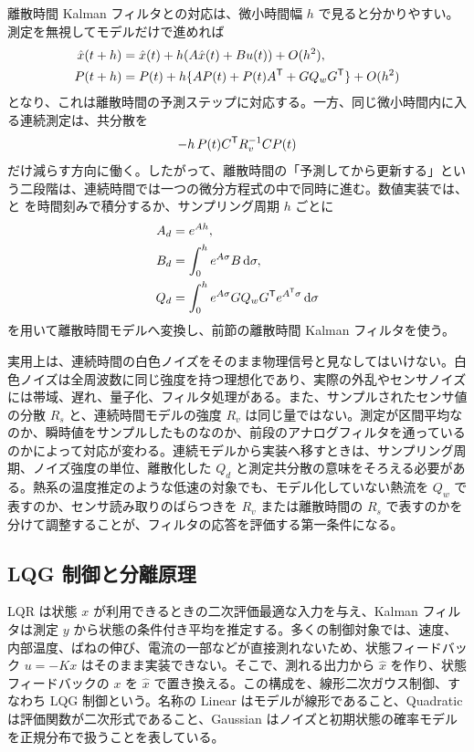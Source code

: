 離散時間 Kalman フィルタとの対応は、微小時間幅 $h$ で見ると分かりやすい。測定を無視してモデルだけで進めれば
\begin{align}
  \hat{x}(t+h)&=\hat{x}(t)+h(A\hat{x}(t)+Bu(t))+O(h^2),\\
  P(t+h)&=P(t)+h\{AP(t)+P(t)A^{\mathsf{T}}+GQ_wG^{\mathsf{T}}\}+O(h^2)
\end{align}
となり、これは離散時間の予測ステップに対応する。一方、同じ微小時間内に入る連続測定は、共分散を
\begin{equation}
  -h\,P(t)C^{\mathsf{T}} R_v^{-1}CP(t)
\end{equation}
だけ減らす方向に働く。したがって、離散時間の「予測してから更新する」という二段階は、連続時間では一つの微分方程式の中で同時に進む。数値実装では、 と  を時間刻みで積分するか、サンプリング周期 $h$ ごとに
\begin{align}
  A_d&=e^{Ah},\\
  B_d&=\int_0^h e^{A\sigma}B\,\mathrm{d}\sigma,\\
  Q_d&=\int_0^h e^{A\sigma}GQ_wG^{\mathsf{T}} e^{A^{\mathsf{T}}\sigma}\,\mathrm{d}\sigma
\end{align}
を用いて離散時間モデルへ変換し、前節の離散時間 Kalman フィルタを使う。

実用上は、連続時間の白色ノイズをそのまま物理信号と見なしてはいけない。白色ノイズは全周波数に同じ強度を持つ理想化であり、実際の外乱やセンサノイズには帯域、遅れ、量子化、フィルタ処理がある。また、サンプルされたセンサ値の分散 $R_s$ と、連続時間モデルの強度 $R_v$ は同じ量ではない。測定が区間平均なのか、瞬時値をサンプルしたものなのか、前段のアナログフィルタを通っているのかによって対応が変わる。連続モデルから実装へ移すときは、サンプリング周期、ノイズ強度の単位、離散化した $Q_d$ と測定共分散の意味をそろえる必要がある。熱系の温度推定のような低速の対象でも、モデル化していない熱流を $Q_w$ で表すのか、センサ読み取りのばらつきを $R_v$ または離散時間の $R_s$ で表すのかを分けて調整することが、フィルタの応答を評価する第一条件になる。

\subsection{LQG 制御と分離原理}

LQR は状態 $x$ が利用できるときの二次評価最適な入力を与え、Kalman フィルタは測定 $y$ から状態の条件付き平均を推定する。多くの制御対象では、速度、内部温度、ばねの伸び、電流の一部などが直接測れないため、状態フィードバック $u=-Kx$ はそのまま実装できない。そこで、測れる出力から $\hat{x}$ を作り、状態フィードバックの $x$ を $\hat{x}$ で置き換える。この構成を、線形二次ガウス制御、すなわち LQG 制御という。名称の Linear はモデルが線形であること、Quadratic は評価関数が二次形式であること、Gaussian はノイズと初期状態の確率モデルを正規分布で扱うことを表している。

